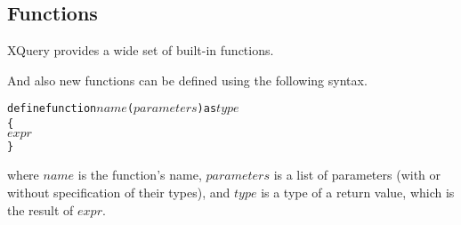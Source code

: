 \subsection{Functions}
XQuery provides a wide set of built-in functions.

And also new functions can be defined using the following syntax.
\begin{alltt}
define function \(name\)(\(parameters\)) as \(type\)
\{
  \(expr\)
\}
\end{alltt}
where $name$ is the function's name, $parameters$ is a list of parameters (with or without specification of their types), and $type$ is a type of a return value, which is the result of $expr$.








